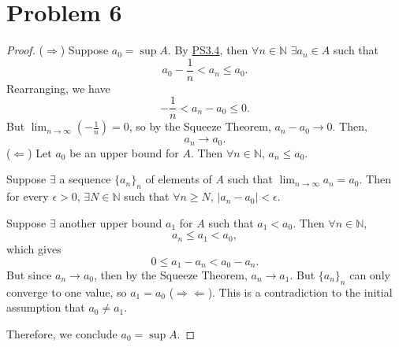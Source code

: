 \documentclass{article}
\begin{document}
\section*{Problem 6}
\begin{proof}
	($\Rightarrow$) Suppose $a_0 = \sup{A}$. By \href{https://github.com/ovega14/RealAnalysis_solutions/blob/main/PS3/18.100A_ps3.pdf}{PS3.4}, then $\forall n \in \mathbb{N}$ $\exists a_n \in A$ such that 
	\begin{equation}
		a_0 - \frac{1}{n} < a_n \leq a_0.
	\end{equation}
	Rearranging, we have
	\begin{equation}
		-\frac{1}{n} < a_n - a_0 \leq 0.
	\end{equation}
	But $\lim_{n\to\infty}\left(-\frac{1}{n}\right)=0$, so by the Squeeze Theorem, $a_n - a_0 \rightarrow 0$. Then,
	\begin{equation}
		a_n \rightarrow a_0.
	\end{equation}
	($\Leftarrow$) Let $a_0$ be an upper bound for $A$. Then $\forall n \in \mathbb{N}$, $a_n \leq a_0$.
	
	Suppose $\exists$ a sequence $\{a_n\}_n$ of elements of $A$ such that $\lim_{n\to\infty}a_n = a_0$. Then for every $\epsilon > 0$, $\exists N\in\mathbb{N}$ such that $\forall n \geq N$, $|a_n - a_0| < \epsilon$.
	
	Suppose $\exists$ another upper bound $a_1$ for $A$ such that $a_1 < a_0$. Then $\forall n \in \mathbb{N}$, 
	\begin{equation}
		a_n \leq a_1 < a_0,
	\end{equation}
	which gives
	\begin{equation}
		0 \leq a_1 - a_n < a_0 - a_n.
	\end{equation}
	But since $a_n \rightarrow a_0$, then by the Squeeze Theorem, $a_n \rightarrow a_1$. But $\{a_n\}_n$ can only converge to one value, so $a_1 = a_0$ ($\Rightarrow\Leftarrow$). This is a contradiction to the initial assumption that $a_0\neq a_1$. 
	
	Therefore, we conclude $a_0=\sup{A}$.  
\end{proof}
\end{document}

